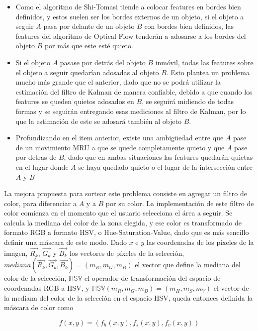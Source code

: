 \begin{itemize}
\item Como el algoritmo de Shi-Tomasi tiende a colocar features en bordes bien definidos, y estos suelen ser los bordes externos de un objeto, si el objeto a seguir $A$ pasa por delante de un objeto $B$ con bordes bien definidos, las features del algoritmo de Optical Flow tenderán a adosarse a los bordes del objeto $B$ por más que este esté quieto.
\item Si el objeto $A$ pasase por detrás del objeto $B$ inmóvil, todas las features sobre el objeto a seguir quedarían adosadas al objeto $B$. Esto plantea un problema mucho más grande que el anterior, dado que no se podrá utilizar la estimación del filtro de Kalman de manera confiable, debido a que cuando los features se queden quietos adosados en $B$, se seguirá midiendo de todas formas y se seguirán entregando esas mediciones al filtro de Kalman, por lo que la estimación de este se adosará también al objeto $B$.
\item Profundizando en el item anterior, existe una ambigüedad entre que $A$ pase de un movimiento MRU a que se quede completamente quieto y que $A$ pase por detras de $B$, dado que en ambas situaciones las features quedarán quietas en el lugar donde $A$ se haya quedado quieto o el lugar de la intersección entre $A$ y $B$
\end{itemize}

La mejora propuesta para sortear este problema consiste en agregar un filtro de color, para diferenciar a $A$ y a $B$ por su color. La implementación de este filtro de color comienza en el momento que el usuario selecciona el área a seguir. Se calcula la mediana del color de la zona elegida, y ese color es transformado de formato RGB a formato HSV, o Hue-Saturation-Value, dado que es más sencillo definir una máscara de este modo. Dado $x$ e $y$ las coordenadas de los píxeles de la imagen, $\vec{R_k}$, $\vec{G_k}$ y $\vec{B_k}$ los vectores de píxeles de la selección, $mediana(\vec{R_k}, \vec{G_k}, \vec{B_k}) = (m_R, m_G, m_B)$ el vector que define la mediana del color de la selección, $\mathbb{HSV}$ el operador de transformación del espacio de coordenadas RGB a HSV, y $\mathbb{HSV}(m_R, m_G, m_B) = (m_H, m_S, m_V)$ el vector de la mediana del color de la selección en el espacio HSV, queda entonces definida la máscara de color como

\begin{equation}
f(x, y) = (f_h(x, y), f_s(x, y), f_v(x, y))
\end{equation}

